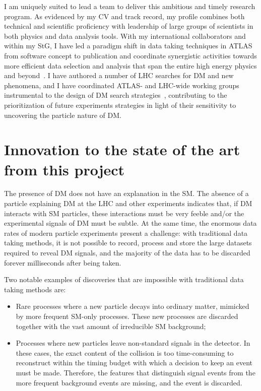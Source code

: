 \documentclass[11pt,a4paper]{article}
\begin{document}
I am uniquely suited to lead a team to deliver this ambitious and timely research program.  
As evidenced by my CV and track record, my profile combines both technical and scientific proficiency with leadership of large groups of scientists in both physics and data analysis tools. 
With my international collaborators and within my StG, I have led a paradigm shift in data taking techniques in ATLAS from software concept to publication and coordinate synergistic activities towards more efficient data selection and analysis that span the entire high energy physics and beyond~\cite{HSF}. I have authored a number of LHC searches for DM and new phenomena, and I have coordinated ATLAS- and LHC-wide working groups instrumental to the design of DM search strategies~\cite{DMWG}, contributing to the prioritization of future experiments strategies in light of their sensitivity to uncovering the particle nature of DM. 

\section{Innovation to the state of the art from this project} 
\smallskip

The presence of DM does not have an explanation in the SM. 
The absence of a particle explaining DM at the LHC and other experiments indicates that, if DM interacts with SM particles, these interactions must be very feeble and/or the experimental signals of DM must be subtle. 
At the same time, the enormous data rates of modern particle experiments present a challenge: with traditional data taking methods, it is not possible to record, process and store the large datasets required to reveal DM signals, and the majority of the data has to be discarded forever milliseconds after being taken. 
  
Two notable examples of discoveries that are impossible with traditional data taking methods are:
\begin{itemize} 
\item Rare processes where a new particle decays into ordinary matter, mimicked by more frequent SM-only processes.
These new processes are discarded together with the vast amount of irreducible SM background;
\item Processes where new particles leave non-standard signals in the detector. 
In these cases, the exact content of the collision is too time-consuming to reconstruct within the timing budget with which a decision to keep an event must be made. Therefore, the features that distinguish signal events from the more frequent background events are missing, and the event is discarded.
\end{itemize}
\end{document}
